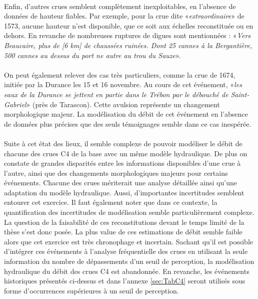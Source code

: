 	\paragraph{} Enfin, d'autres crues semblent complètement inexploitables, en l'absence de données de hauteur fiables. Par exemple, pour la crue dite «\textit{extraordinaire}» de 1573, aucune hauteur n'est disponible, que ce soit aux échelles reconstituée ou en dehors. En revanche de nombreuses ruptures de digues sont mentionnées : «\textit{Vers Beaucaire, plus de [6 km] de chaussées ruinées. Dont 25 cannes à la Bergantière, 500 cannes au dessus du port ne autre au trou du Sauze}». 
	
	\paragraph{} On peut également relever des cas très particuliers, comme la crue de 1674, initiée par la Durance les 15 et 16 novembre. Au cours de cet événement, «\textit{les eaux de la Durance se jettent en partie dans le Trébon par le débouché de Saint-Gabriel}» (près de Tarascon). Cette avulsion représente un changement morphologique majeur. La modélisation du débit de cet événement en l'absence de données plus précises que des seuls témoignages semble dans ce cas inespérée.	
	
	\paragraph{} Suite à cet état des lieux, il semble complexe de pouvoir modéliser le débit de chacune des crues C4 de la base avec un même modèle hydraulique. De plus on constate de grandes disparités entre les informations disponibles d'une crue à l'autre, ainsi que des changements morphologiques majeurs pour certains événements. Chacune des crues mériterait une analyse détaillée ainsi qu'une adaptation du modèle hydraulique. Aussi, d'importantes incertitudes semblent entourer cet exercice. Il faut également noter que dans ce contexte, la quantification des incertitudes de modélisation semble particulièrement complexe. La question de la faisabilité de ces reconstitutions devant le temps limité de la thèse s'est donc posée. La plus value de ces estimations de débit semble faible alors que cet exercice est très chronophage et incertain. Sachant qu'il est possible d'intégrer ces événements à l'analyse fréquentielle des crues en utilisant la seule information du nombre de dépassements d'un seuil de perception, la modélisation hydraulique du débit des crues C4 est abandonnée. En revanche, les événements historiques présentés ci-dessus et dans l'annexe \ref{sec:TabC4} seront utilisés sous forme d'occurrences supérieures à un seuil de perception. 
	
